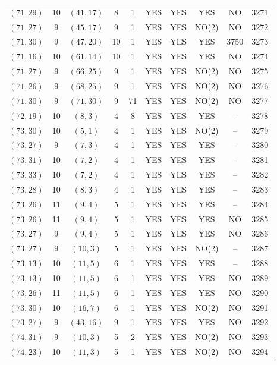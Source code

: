 \begin{longtable}{|c|c|c|c|c|c|c|c|c|c|}
$(71, 29)$ & 10 & $(41, 17)$ & 8 & 1 & YES & YES & YES & NO & 3271\\
$(71, 27)$ & 9 & $(45, 17)$ & 9 & 1 & YES & YES & NO(2) & NO & 3272\\
$(71, 30)$ & 9 & $(47, 20)$ & 10 & 1 & YES & YES & YES & 3750 & 3273\\
$(71, 16)$ & 10 & $(61, 14)$ & 10 & 1 & YES & YES & YES & NO & 3274\\
$(71, 27)$ & 9 & $(66, 25)$ & 9 & 1 & YES & YES & NO(2) & NO & 3275\\
$(71, 26)$ & 9 & $(68, 25)$ & 9 & 1 & YES & YES & NO(2) & NO & 3276\\
$(71, 30)$ & 9 & $(71, 30)$ & 9 & 71 & YES & YES & NO(2) & NO & 3277\\
$(72, 19)$ & 10 & $(8, 3)$ & 4 & 8 & YES & YES & YES & -- & 3278\\
$(73, 30)$ & 10 & $(5, 1)$ & 4 & 1 & YES & YES & NO(2) & -- & 3279\\
$(73, 27)$ & 9 & $(7, 3)$ & 4 & 1 & YES & YES & YES & -- & 3280\\
$(73, 31)$ & 10 & $(7, 2)$ & 4 & 1 & YES & YES & YES & -- & 3281\\
$(73, 33)$ & 10 & $(7, 2)$ & 4 & 1 & YES & YES & YES & -- & 3282\\
$(73, 28)$ & 10 & $(8, 3)$ & 4 & 1 & YES & YES & YES & -- & 3283\\
$(73, 26)$ & 11 & $(9, 4)$ & 5 & 1 & YES & YES & YES & -- & 3284\\
$(73, 26)$ & 11 & $(9, 4)$ & 5 & 1 & YES & YES & YES & NO & 3285\\
$(73, 27)$ & 9 & $(9, 4)$ & 5 & 1 & YES & YES & YES & NO & 3286\\
$(73, 27)$ & 9 & $(10, 3)$ & 5 & 1 & YES & YES & NO(2) & -- & 3287\\
$(73, 13)$ & 10 & $(11, 5)$ & 6 & 1 & YES & YES & YES & -- & 3288\\
$(73, 13)$ & 10 & $(11, 5)$ & 6 & 1 & YES & YES & YES & NO & 3289\\
$(73, 26)$ & 11 & $(11, 5)$ & 6 & 1 & YES & YES & YES & NO & 3290\\
$(73, 30)$ & 10 & $(16, 7)$ & 6 & 1 & YES & YES & NO(2) & NO & 3291\\
$(73, 27)$ & 9 & $(43, 16)$ & 9 & 1 & YES & YES & YES & NO & 3292\\
$(74, 31)$ & 9 & $(10, 3)$ & 5 & 2 & YES & YES & NO(2) & NO & 3293\\
$(74, 23)$ & 10 & $(11, 3)$ & 5 & 1 & YES & YES & NO(2) & NO & 3294\\

\end{longtable}
